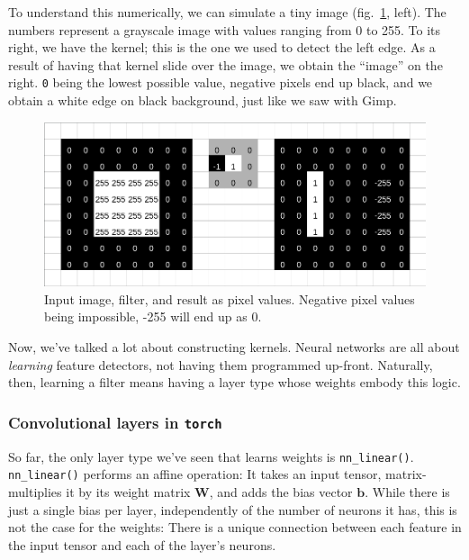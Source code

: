 \documentclass[
  letterpaper,
]{krantz}
\begin{document}
To understand this numerically, we can simulate a tiny image
(fig.~\ref{fig-images-cross-correlation}, left). The numbers represent a
grayscale image with values ranging from 0 to 255. To its right, we have
the kernel; this is the one we used to detect the left edge. As a result
of having that kernel slide over the image, we obtain the ``image'' on
the right. \texttt{0} being the lowest possible value, negative pixels
end up black, and we obtain a white edge on black background, just like
we saw with Gimp.

\begin{figure}[H]

{\centering \includegraphics{images/images-cross-correlation.png}

}

\caption{\label{fig-images-cross-correlation}Input image, filter, and
result as pixel values. Negative pixel values being impossible, -255
will end up as 0.}

\end{figure}

Now, we've talked a lot about constructing kernels. Neural networks are
all about \emph{learning} feature detectors, not having them programmed
up-front. Naturally, then, learning a filter means having a layer type
whose weights embody this logic.

\hypertarget{convolutional-layers-in-torch}{%
\subsubsection{\texorpdfstring{Convolutional layers in
\texttt{torch}}{Convolutional layers in torch}}\label{convolutional-layers-in-torch}}

So far, the only layer type we've seen that learns weights is
\texttt{nn\_linear()}. \texttt{nn\_linear()} performs an affine
operation: It takes an input tensor, matrix-multiplies it by its weight
matrix \(\mathbf{W}\), and adds the bias vector \(\mathbf{b}\). While
there is just a single bias per layer, independently of the number of
neurons it has, this is not the case for the weights: There is a unique
connection between each feature in the input tensor and each of the
layer's neurons.
\end{document}
